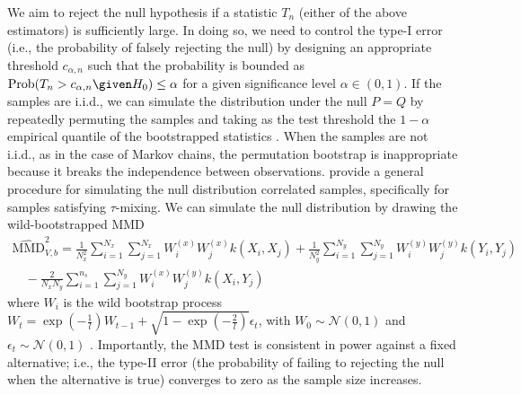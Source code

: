 We aim to reject the null hypothesis if a statistic $T_n$ (either of the above estimators) is sufficiently large. 
In doing so, we need to control the type-I error (i.e., the probability of falsely rejecting the null) by designing an appropriate threshold $c_{\alpha, n}$ such that the probability is bounded as $\mathrm{Prob} (T_n > c_{\alpha, n}\given H_0)\leq \alpha$ for a given significance level $\alpha \in (0,1)$.
If the samples are i.i.d., we can simulate the distribution under the null $P=Q$ by repeatedly permuting the samples and taking as the test threshold the $1-\alpha$ empirical quantile of the bootstrapped statistics \citep{gretton_kernel_2012}. 
When the samples are not i.i.d., as in the case of Markov chains, the permutation bootstrap is inappropriate because it breaks the independence between observations.
\cite{chwialkowski_wild_2016} provide a general procedure for simulating the null distribution correlated samples, specifically for samples satisfying $\tau$-mixing. 
We can simulate the null distribution by drawing the wild-bootstrapped MMD
\begin{equation}
\begin{array}{c}
\widehat{\mathrm{MMD}}^{2}_{V, b}=\frac{1}{N_{x}^{2}} \sum_{i=1}^{N_{x}} \sum_{j=1}^{N_{x}} W_{i}^{(x)} W_{j}^{(x)} k\left(X_{i}, X_{j}\right)+\frac{1}{N_{y}^{2}} \sum_{i=1}^{N_{y}} \sum_{j=1}^{N_{y}} W_{i}^{(y)} W_{j}^{(y)} k\left(Y_{i}, Y_{j}\right) \\
\quad-\frac{2}{N_{x} N_{y}} \sum_{i=1}^{n_{s}} \sum_{j=1}^{N_{y}} W_{i}^{(x)} W_{j}^{(y)} k\left(X_{i}, Y_{j}\right)
\end{array}
\label{eq:wb_mmd}
\end{equation}
where $W_{i}$ is the wild bootstrap process $    W_{t}=\exp{\left(-\frac{1}{l}\right)} W_{t-1}+\sqrt{1-\exp{\left(-\frac{2}{l}\right)}} \epsilon_{t}$,
with $W_{0} \sim \mathcal{N}(0,1)$ and $\epsilon_{t} \sim \mathcal{N}(0,1)$ \citep{leucht_dependent_2013, chwialkowski_wild_2016}.
Importantly, the MMD test is consistent in power against a fixed alternative; i.e., the type-II error (the probability of failing to rejecting the null when the alternative is true) converges to zero as the sample size increases.

